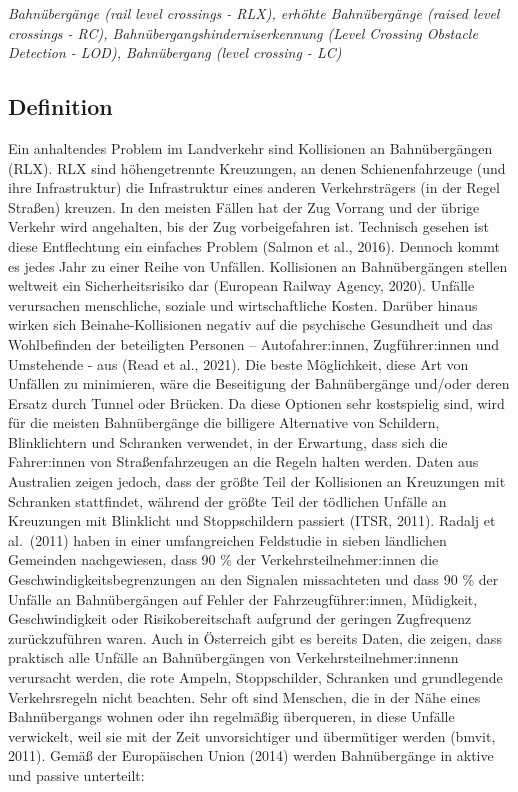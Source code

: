 \documentclass[
]{book}
\begin{document}
\emph{Bahnübergänge (rail level crossings - RLX), erhöhte Bahnübergänge (raised level crossings - RC), Bahnübergangshinderniserkennung (Level Crossing Obstacle Detection - LOD), Bahnübergang (level crossing - LC)}

\hypertarget{definition-2}{%
\subsection*{Definition}\label{definition-2}}

Ein anhaltendes Problem im Landverkehr sind Kollisionen an Bahnübergängen (RLX). RLX sind höhengetrennte Kreuzungen, an denen Schienenfahrzeuge (und ihre Infrastruktur) die Infrastruktur eines anderen Verkehrsträgers (in der Regel Straßen) kreuzen. In den meisten Fällen hat der Zug Vorrang und der übrige Verkehr wird angehalten, bis der Zug vorbeigefahren ist. Technisch gesehen ist diese Entflechtung ein einfaches Problem (Salmon et al., 2016). Dennoch kommt es jedes Jahr zu einer Reihe von Unfällen.
Kollisionen an Bahnübergängen stellen weltweit ein Sicherheitsrisiko dar (European Railway Agency, 2020). Unfälle verursachen menschliche, soziale und wirtschaftliche Kosten. Darüber hinaus wirken sich Beinahe-Kollisionen negativ auf die psychische Gesundheit und das Wohlbefinden der beteiligten Personen -- Autofahrer:innen, Zugführer:innen und Umstehende - aus (Read et al., 2021). Die beste Möglichkeit, diese Art von Unfällen zu minimieren, wäre die Beseitigung der Bahnübergänge und/oder deren Ersatz durch Tunnel oder Brücken. Da diese Optionen sehr kostspielig sind, wird für die meisten Bahnübergänge die billigere Alternative von Schildern, Blinklichtern und Schranken verwendet, in der Erwartung, dass sich die Fahrer:innen von Straßenfahrzeugen an die Regeln halten werden. Daten aus Australien zeigen jedoch, dass der größte Teil der Kollisionen an Kreuzungen mit Schranken stattfindet, während der größte Teil der tödlichen Unfälle an Kreuzungen mit Blinklicht und Stoppschildern passiert (ITSR, 2011).
Radalj et al.~(2011) haben in einer umfangreichen Feldstudie in sieben ländlichen Gemeinden nachgewiesen, dass 90 \% der Verkehrsteilnehmer:innen die Geschwindigkeitsbegrenzungen an den Signalen missachteten und dass 90 \% der Unfälle an Bahnübergängen auf Fehler der Fahrzeugführer:innen, Müdigkeit, Geschwindigkeit oder Risikobereitschaft aufgrund der geringen Zugfrequenz zurückzuführen waren. Auch in Österreich gibt es bereits Daten, die zeigen, dass praktisch alle Unfälle an Bahnübergängen von Verkehrsteilnehmer:innenn verursacht werden, die rote Ampeln, Stoppschilder, Schranken und grundlegende Verkehrsregeln nicht beachten. Sehr oft sind Menschen, die in der Nähe eines Bahnübergangs wohnen oder ihn regelmäßig überqueren, in diese Unfälle verwickelt, weil sie mit der Zeit unvorsichtiger und übermütiger werden (bmvit, 2011).
Gemäß der Europäischen Union (2014) werden Bahnübergänge in aktive und passive unterteilt:
\end{document}
